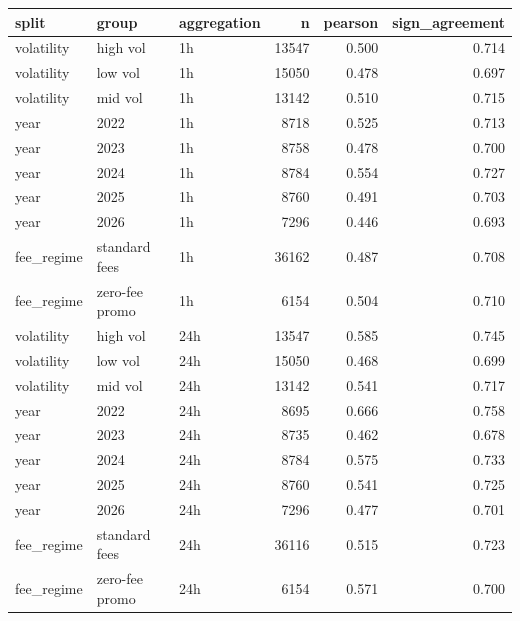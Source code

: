 \begin{tabular}{lllrrr}
\toprule
split & group & aggregation & n & pearson & sign_agreement \\
\midrule
volatility & high vol & 1h & 13547 & 0.500 & 0.714 \\
volatility & low vol & 1h & 15050 & 0.478 & 0.697 \\
volatility & mid vol & 1h & 13142 & 0.510 & 0.715 \\
year & 2022 & 1h & 8718 & 0.525 & 0.713 \\
year & 2023 & 1h & 8758 & 0.478 & 0.700 \\
year & 2024 & 1h & 8784 & 0.554 & 0.727 \\
year & 2025 & 1h & 8760 & 0.491 & 0.703 \\
year & 2026 & 1h & 7296 & 0.446 & 0.693 \\
fee_regime & standard fees & 1h & 36162 & 0.487 & 0.708 \\
fee_regime & zero-fee promo & 1h & 6154 & 0.504 & 0.710 \\
volatility & high vol & 24h & 13547 & 0.585 & 0.745 \\
volatility & low vol & 24h & 15050 & 0.468 & 0.699 \\
volatility & mid vol & 24h & 13142 & 0.541 & 0.717 \\
year & 2022 & 24h & 8695 & 0.666 & 0.758 \\
year & 2023 & 24h & 8735 & 0.462 & 0.678 \\
year & 2024 & 24h & 8784 & 0.575 & 0.733 \\
year & 2025 & 24h & 8760 & 0.541 & 0.725 \\
year & 2026 & 24h & 7296 & 0.477 & 0.701 \\
fee_regime & standard fees & 24h & 36116 & 0.515 & 0.723 \\
fee_regime & zero-fee promo & 24h & 6154 & 0.571 & 0.700 \\
\bottomrule
\end{tabular}
